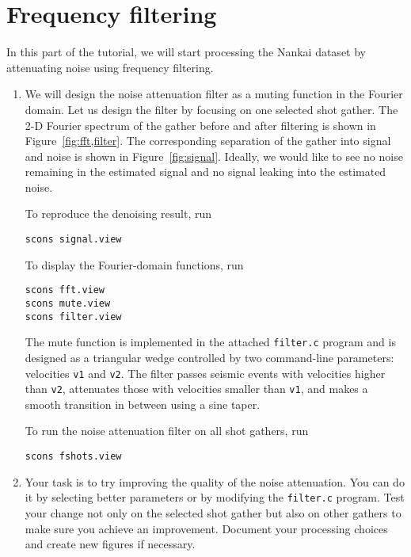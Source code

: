 \section{Frequency filtering}

In this part of the tutorial, we will start processing the Nankai dataset by 
attenuating noise using frequency filtering. 

\begin{enumerate}     
\item We will design the noise attenuation filter as a muting function in the Fourier domain. 
Let us design the filter by focusing on one selected shot gather. The
2-D Fourier spectrum of the gather before and after filtering is shown
in Figure~\ref{fig:fft,filter}. The corresponding separation of the gather into signal and noise is shown in Figure~\ref{fig:signal}. Ideally, we would like to see no noise remaining in the estimated signal and no signal leaking into the estimated noise.

To reproduce the denoising result, run
\begin{verbatim}
scons signal.view
\end{verbatim}
To display the Fourier-domain functions, run
\begin{verbatim}
scons fft.view
scons mute.view
scons filter.view
\end{verbatim}

The mute function is implemented in the attached \texttt{filter.c}
program and is designed as a triangular wedge controlled by two
command-line parameters: velocities \texttt{v1} and \texttt{v2}. The
filter passes seismic events with velocities higher than \texttt{v2},
attenuates those with velocities smaller than \texttt{v1}, and makes a
smooth transition in between using a sine taper. 



To run the noise attenuation filter on all shot gathers, run
\begin{verbatim}
scons fshots.view
\end{verbatim}

\item Your task is to try improving the quality of the noise attenuation. You can do it by selecting better parameters or by modifying the \texttt{filter.c} program. Test your change not only on the selected shot gather but also on other gathers to make sure you achieve an improvement. Document your processing choices and create new figures if necessary.

\end{enumerate}


